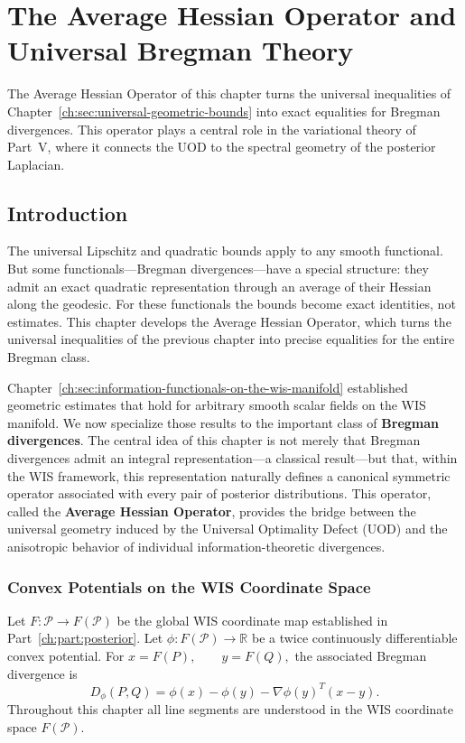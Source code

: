 \chapter[Average Hessian Operator]{The Average Hessian Operator and Universal Bregman Theory}\label{ch:sec:the-average-hessian-operator-and-universal-bregman-theo}

The Average Hessian Operator of this chapter turns the universal inequalities of Chapter~\ref{ch:sec:universal-geometric-bounds} into exact equalities for Bregman divergences. This operator plays a central role in the variational theory of Part~V, where it connects the UOD to the spectral geometry of the posterior Laplacian.


\section{Introduction}\label{ch:sec:introduction-bregman}
The universal Lipschitz and quadratic bounds apply to any smooth
functional.  But some functionals---Bregman divergences---have a special
structure: they admit an exact quadratic representation through an
average of their Hessian along the geodesic.  For these functionals the
bounds become exact identities, not estimates.  This chapter develops
the Average Hessian Operator, which turns the universal inequalities of
the previous chapter into precise equalities for the entire Bregman
class.

Chapter~\ref{ch:sec:information-functionals-on-the-wis-manifold} established geometric estimates that hold for arbitrary
smooth scalar fields on the WIS manifold. We now specialize those
results to the important class of \textbf{Bregman divergences}.
The central idea of this chapter is not merely that Bregman divergences
admit an integral representation---a classical result---but that, within
the WIS framework, this representation naturally defines a canonical
symmetric operator associated with every pair of posterior
distributions.
This operator, called the \textbf{Average Hessian Operator}, provides the
bridge between the universal geometry induced by the Universal
Optimality Defect (UOD) and the anisotropic behavior of individual
information-theoretic divergences.
\subsection{Convex Potentials on the WIS Coordinate Space}\label{ch:sec:convex-potentials-on-the-wis-coordinate-space}
Let
$F:\mathcal P\rightarrow F(\mathcal P)$
be the global WIS coordinate map established in Part~\ref{ch:part:posterior}.
Let $\phi:F(\mathcal P)\rightarrow\mathbb R$ be a twice continuously differentiable convex potential.
For
$x=F(P),\qquad y=F(Q),$
the associated Bregman divergence is
\[ D_\phi(P,Q) =
\phi(x)-\phi(y)-\nabla\phi(y)^T(x-y).
\]
Throughout this chapter all line segments are understood in the WIS
coordinate space \(F(\mathcal P)\).

